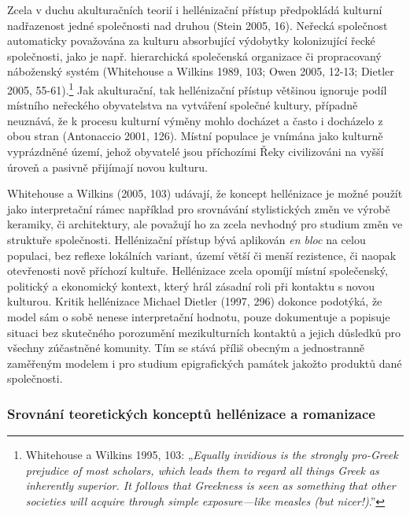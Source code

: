 Zcela v duchu akulturačních teorií i hellénizační přístup předpokládá kulturní nadřazenost jedné společnosti nad druhou (Stein 2005, 16). Neřecká společnost automaticky považována za kulturu absorbující výdobytky kolonizující řecké společnosti, jako je např. hierarchická společenská organizace či propracovaný náboženský systém (Whitehouse a Wilkins 1989, 103; Owen 2005, 12-13; Dietler 2005, 55-61).\footnote{Whitehouse a Wilkins 1995, 103: „{\em Equally invidious is the strongly pro-Greek prejudice of most scholars, which leads them to regard all things Greek as inherently superior. It follows that Greekness is seen as something that other societies will acquire through simple exposure---like measles (but nicer!)}.”} Jak akulturační, tak hellénizační přístup většinou ignoruje podíl místního neřeckého obyvatelstva na vytváření společné kultury, případně neuznává, že k procesu kulturní výměny mohlo docházet a často i docházelo z obou stran (Antonaccio 2001, 126). Místní populace je vnímána jako kulturně vyprázdněné území, jehož obyvatelé jsou příchozími Řeky civilizováni na vyšší úroveň a pasivně přijímají novou kulturu.

Whitehouse a Wilkins (2005, 103) udávají, že koncept hellénizace je možné použít jako interpretační rámec například pro srovnávání stylistických změn ve výrobě keramiky, či architektury, ale považují ho za zcela nevhodný pro studium změn ve struktuře společnosti. Hellénizační přístup bývá aplikován {\em en bloc} na celou populaci, bez reflexe lokálních variant, území větší či menší rezistence, či naopak otevřenosti nově příchozí kultuře. Hellénizace zcela opomíjí místní společenský, politický a ekonomický kontext, který hrál zásadní roli při kontaktu s novou kulturou. Kritik hellénizace Michael Dietler (1997, 296) dokonce podotýká, že model sám o sobě nenese interpretační hodnotu, pouze dokumentuje a popisuje situaci bez skutečného porozumění mezikulturních kontaktů a jejich důsledků pro všechny zúčastněné komunity. Tím se stává příliš obecným a jednostranně zaměřeným modelem i pro studium epigrafických památek jakožto produktů dané společnosti.

\subsubsection[srovnání-teoretických-konceptů-hellénizace-a-romanizace]{Srovnání teoretických konceptů hellénizace a romanizace}


